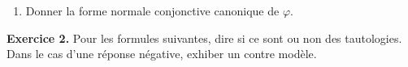\documentclass[a4paper,french,bookmarks]{book}
\begin{document}
\begin{enumerate}
    
    \item Donner la forme normale conjonctive canonique de $\varphi$.
    
    \end{enumerate}
    
    \textbf{Exercice 2.} Pour les formules suivantes, dire si ce sont ou non des tautologies. Dans le cas d'une réponse négative, exhiber un contre modèle.
    
\end{document}
